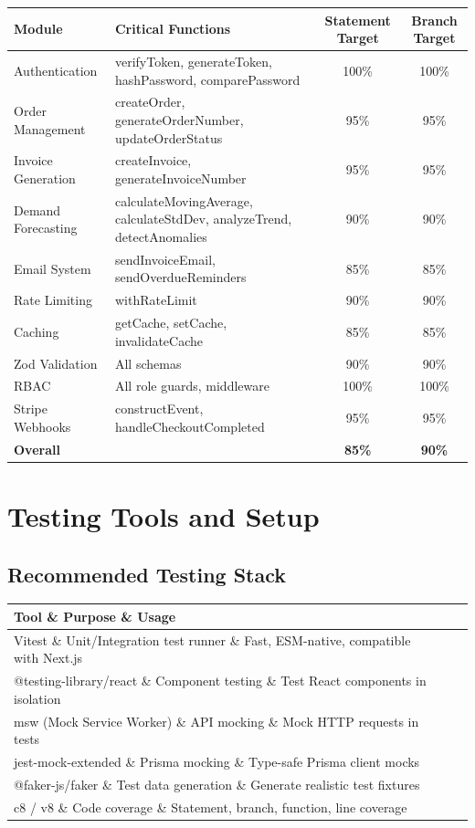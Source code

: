 ﻿\documentclass[12pt,a4paper]{report}
\begin{document}
\begin{center}
\begin{tabularx}{\textwidth}{lXcc}
  \toprule
  \textbf{Module} & \textbf{Critical Functions} & \textbf{Statement Target} & \textbf{Branch Target} \\
  \midrule
  Authentication     & verifyToken, generateToken, hashPassword, comparePassword & 100\% & 100\% \\
  Order Management   & createOrder, generateOrderNumber, updateOrderStatus & 95\%  & 95\%  \\
  Invoice Generation & createInvoice, generateInvoiceNumber & 95\%  & 95\%  \\
  Demand Forecasting & calculateMovingAverage, calculateStdDev, analyzeTrend, detectAnomalies & 90\%  & 90\%  \\
  Email System       & sendInvoiceEmail, sendOverdueReminders & 85\%  & 85\%  \\
  Rate Limiting      & withRateLimit & 90\%  & 90\%  \\
  Caching            & getCache, setCache, invalidateCache & 85\%  & 85\%  \\
  Zod Validation     & All schemas & 90\%  & 90\%  \\
  RBAC               & All role guards, middleware & 100\% & 100\% \\
  Stripe Webhooks    & constructEvent, handleCheckoutCompleted & 95\%  & 95\%  \\
  \midrule
  \textbf{Overall}   & & \textbf{85\%} & \textbf{90\%} \\
  \bottomrule
\end{tabularx}
\end{center}

\section{Testing Tools and Setup}
\subsection{Recommended Testing Stack}
\begin{center}
\begin{tabularx}{\textwidth}{llX}
  \toprule
  \textbf{Tool} \& \textbf{Purpose} \& \textbf{Usage} \\
  \midrule
  Vitest \& Unit/Integration test runner \& Fast, ESM-native, compatible with Next.js \\
  @testing-library/react \& Component testing \& Test React components in isolation \\
  msw (Mock Service Worker) \& API mocking \& Mock HTTP requests in tests \\
  jest-mock-extended \& Prisma mocking \& Type-safe Prisma client mocks \\
  @faker-js/faker \& Test data generation \& Generate realistic test fixtures \\
  c8 / v8 \& Code coverage \& Statement, branch, function, line coverage \\
  \bottomrule
\end{tabularx}
\end{center}
\end{document}
